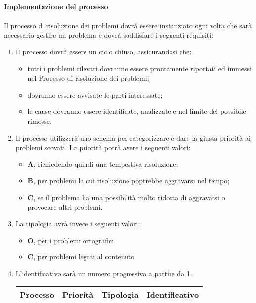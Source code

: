 		\paragraph{Implementazione del processo}
			Il processo di risoluzione dei problemi dovrà essere instanziato ogni volta che sarà necessario gestire un problema e dovrà soddisfare i seguenti requisiti:
			\begin{enumerate}
				\item Il processo dovrà essere un ciclo chiuso, assicurandosi che:
					\begin{itemize}
				 		\item tutti i problemi rilevati dovranno essere prontamente riportati ed immessi nel Processo di risoluzione dei problemi;
					 	\item dovranno essere avvisate le parti interessate;
				 		\item le cause dovranno essere identificate, analizzate e nel limite del possibile rimosse.
					 \end{itemize}  
				
				\item Il processo utilizzerà uno schema per categorizzare e dare la giusta priorità ai problemi scovati. La priorità potrà avere i seguenti valori:
					\begin{itemize}
					 	\item \textbf{A}, richiedendo quindi una tempestiva risoluzione;
					 	\item \textbf{B}, per problemi la cui risoluzione poptrebbe aggravarsi nel tempo;
					 	\item \textbf{C}, se il problema ha una possibilità molto ridotta di aggravarsi o provocare altri problemi. 
					 \end{itemize} 
				\item La tipologia avrà invece i seguenti valori:
					\begin{itemize}
						\item \textbf{O}, per i problemi ortografici
						\item \textbf{C}, per problemi legati al contenuto
					\end{itemize}
				\item L'identificativo sarà un numero progressivo a partire da 1.	
					\begin{center}
						\begin{longtable}{|c|c|c|c|}
							\hline
							\rowcolor{lighter-grayer}
							\textbf{Processo} & \textbf{Priorità} & \textbf{Tipologia} & \textbf{Identificativo}\\
							\hline
							\endfirsthead
							\hline
			

\end{longtable}
\end{center}
\end{enumerate}
